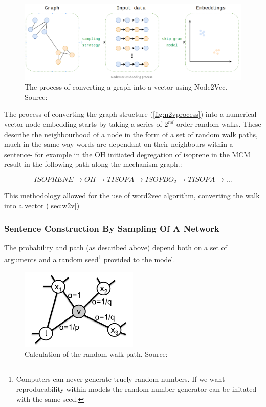 \begin{figure}[H]
  \centering
\includegraphics[width=\textwidth]{4fig/n2vproc.png}
\caption{The process of converting a graph into a vector using Node2Vec. Source:\citep{n2vimg}}\label{fig:n2vprocess}
\end{figure}


The process of converting the graph structure (\autoref{fig:n2vprocess}) into a numerical vector node embedding starts by taking a series of $2^{nd}$ order random walks. These describe the neighbourhood of a node in the form of a set of random walk paths, much in the same way words are dependant on their neighbours within a sentence- for example in the OH initiated degregation of isoprene in the MCM result in the following path along the mechanism graph.:


\begin{equation}
ISOPRENE \rightarrow OH \rightarrow TISOPA \rightarrow ISOPBO_2 \rightarrow TISOPA \rightarrow...
\label{eqn:w2varrow}
\end{equation}

This methodology allowed for the use of word2vec algorithm, converting the walk into a vector (\autoref{sec:w2v})



\subsubsection{Sentence Construction By Sampling Of A Network}
The probability and path (as described above) depend both on a set of arguments and a random seed\footnote{Computers can never generate truely random numbers. If we want reproducability within models the random number generator can be initated with the same seed.} provided to the model.

\begin{figure}[H]
  \centering
\includegraphics[width=0.5\textwidth]{4fig/n2vedge.png}
\caption{Calculation of the random walk path. Source:\citep{node2vec}}\label{fig:n2vedge}
\end{figure}


